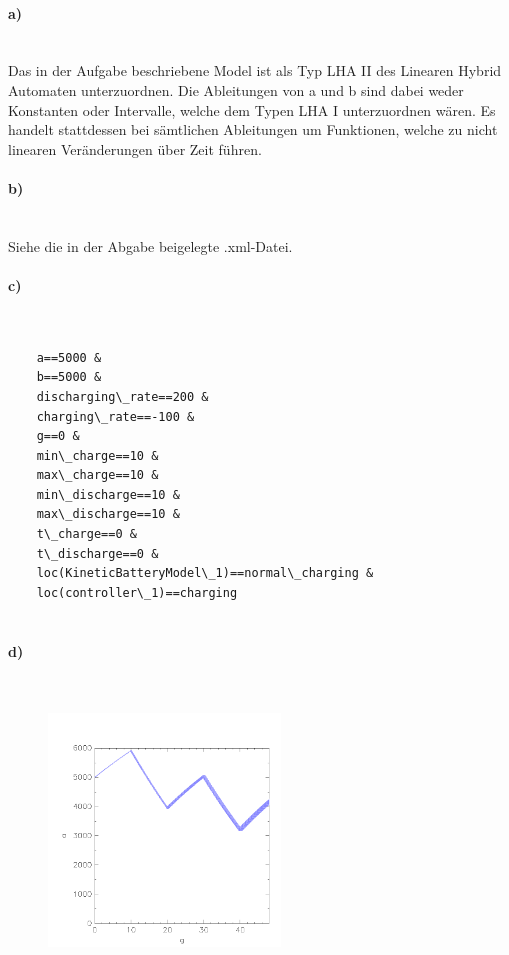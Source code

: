
\paragraph{a)}\mbox{} \\

Das in der Aufgabe beschriebene Model ist als Typ LHA II des Linearen Hybrid Automaten unterzuordnen. Die Ableitungen von a und b sind dabei weder Konstanten oder Intervalle, welche dem Typen LHA I unterzuordnen wären. Es handelt stattdessen bei sämtlichen Ableitungen um Funktionen, welche zu nicht linearen Veränderungen über Zeit führen. 

\paragraph{b)}\mbox{} \\

Siehe die in der Abgabe beigelegte .xml-Datei. 

\paragraph{c)}\mbox{} \\

\begin{lstlisting}
	a==5000 &
	b==5000 &
	discharging\_rate==200 &
	charging\_rate==-100 &
	g==0 &
	min\_charge==10 &
	max\_charge==10 &
	min\_discharge==10 & 
	max\_discharge==10 &
	t\_charge==0 &
	t\_discharge==0 &
	loc(KineticBatteryModel\_1)==normal\_charging &
	loc(controller\_1)==charging 		
	
\end{lstlisting}


\paragraph{d)}\mbox{} \\

\begin{figure}[H]
	\centering
	\includegraphics[width=0.55\textwidth]{Aufgabe_d).png}
\end{figure}	
	

